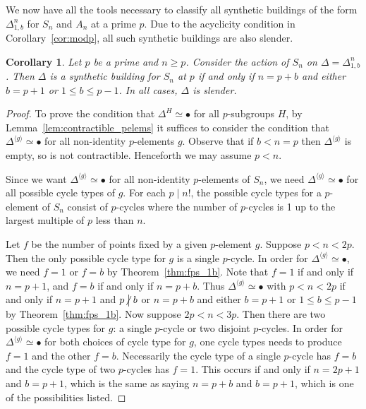 \documentclass[12pt]{amsart}
\theoremstyle{plain}
\newtheorem{corollary}[theorem]{Corollary}
\theoremstyle{definition}
\theoremstyle{remark}
\numberwithin{equation}{section}
\newcommand{\notdivide}{\kern-2.1pt\not\kern2.1pt\bigm|}
\begin{document}
We now have all the tools necessary to classify all synthetic buildings of the form $\Delta^n_{1,b}$ for $S_n$ and $A_n$ at a prime $p$. Due to the acyclicity condition in Corollary~\ref{cor:modp}, all such synthetic buildings are also slender.

\begin{corollary}\label{cor:sbs_1b_sn}
    Let $p$ be a prime and $n\ge p$. Consider the action of $S_n$ on $\Delta=\Delta^n_{1,b}$. Then $\Delta$ is a synthetic building for $S_n$ at $p$ if and only if $n=p+b$ and either $b=p+1$ or $1\le b\le p-1$. In all cases, $\Delta$ is slender.
\end{corollary}
\begin{proof}
To prove the condition that $\Delta^H\simeq \bullet$ for all $p$-subgroups $H$, by Lemma~\ref{lem:contractible_pelems} it suffices to consider the condition that $\Delta^{\langle g\rangle}\simeq\bullet$ for all non-identity $p$-elements $g$. Observe that if $b<n=p$ then $\Delta^{\langle g\rangle}$ is empty, so is not contractible. Henceforth we may assume $p<n$.
    
Since we want $\Delta^{\langle g\rangle}\simeq \bullet$ for all non-identity $p$-elements of $S_n$, we need $\Delta^{\langle g\rangle}\simeq \bullet$ for all possible cycle types of $g$. For each $p\mid n!$, the possible cycle types for a $p$-element of $S_n$ consist of $p$-cycles where the number of $p$-cycles is 1 up to the largest multiple of $p$ less than $n$. 
    
Let $f$ be the number of points fixed by a given $p$-element $g$. Suppose $p<n<2p$. Then the only possible cycle type for $g$ is a single $p$-cycle. In order for $\Delta^{\langle g\rangle}\simeq \bullet$, we need $f=1$ or $f=b$ by Theorem~\ref{thm:fps_1b}. Note that $f=1$ if and only if $n=p+1$, and $f=b$ if and only if $n=p+b$. Thus $\Delta^{\langle g\rangle}\simeq \bullet$ with $p<n<2p$ if and only if $n=p+1$ and $p\notdivide b$ or $n=p+b$ and either $b=p+1$ or $1\leq b\leq p-1$ by Theorem~\ref{thm:fps_1b}. Now suppose $2p<n<3p$. Then there are two possible cycle types for $g$: a single $p$-cycle or two disjoint $p$-cycles. In order for $\Delta^{\langle g\rangle}\simeq \bullet$ for both choices of cycle type for $g$, one cycle types needs to produce $f=1$ and the other $f=b$. Necessarily the cycle type of a single $p$-cycle has $f=b$ and the cycle type of two $p$-cycles has $f=1$. This occurs if and only if $n=2p+1$ and $b=p+1$, which is the same as saying $n=p+b$ and $b=p+1$, which is one of the possibilities listed.


\end{proof}
\end{document}
